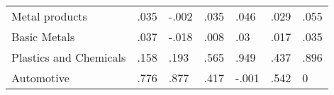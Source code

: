 \begin{table}[tbp] \centering
{}

\begin{tabularx}{\linewidth}{lCCCCCC}

\toprule
Metal products &.035&-.002&.035&.046&.029&.055 \tabularnewline
Basic Metals&.037&-.018&.008&.03&.017&.035 \tabularnewline
Plastics and Chemicals&.158&.193&.565&.949&.437&.896 \tabularnewline
Automotive&.776&.877&.417&-.001&.542&0 \tabularnewline
\bottomrule 

\end{tabularx}
\end{table}
